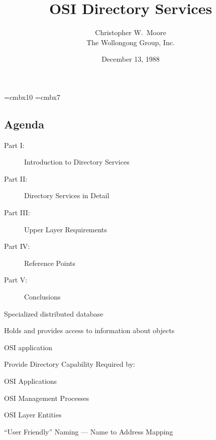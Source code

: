
\def\emph#1{\underline{#1}}
\font\xx=cmbx10
\font\yy=cmbx7


\raggedright

%
\let\tradeNAMfont=\relax
\let\tradeORGfont=\relax



\title	{OSI Directory Services}
\author	{Christopher W.~Moore\\ The Wollongong Group, Inc.}
\date	{December 13, 1988}
\maketitlepage

\begin{bwslide}
\part*	{Agenda}

\begin{description}
\item[Part I:]		Introduction to Directory Services
\item[Part II:]		Directory Services in Detail
\item[Part III:]	Upper Layer Requirements
\item[Part IV:]		Reference Points
\item[Part V:]		Conclusions
\end{description}
\end{bwslide}

\begin{bwslide}
\end{bwslide}

\begin{bwslide}

\begin{nrtc}
\item	Specialized distributed database
\item	Holds and provides access to information about objects
\item	OSI application
\end{nrtc}
\end{bwslide}

\begin{bwslide}

\begin{nrtc}
\item	Provide Directory Capability Required by:
	\begin{nrtc}
	\item	OSI Applications
	\item	OSI Management Processes
	\item	OSI Layer Entities
	\end{nrtc}
\item	``User Friendly'' Naming --- Name to Address Mapping
\end{nrtc}
\end{bwslide}

